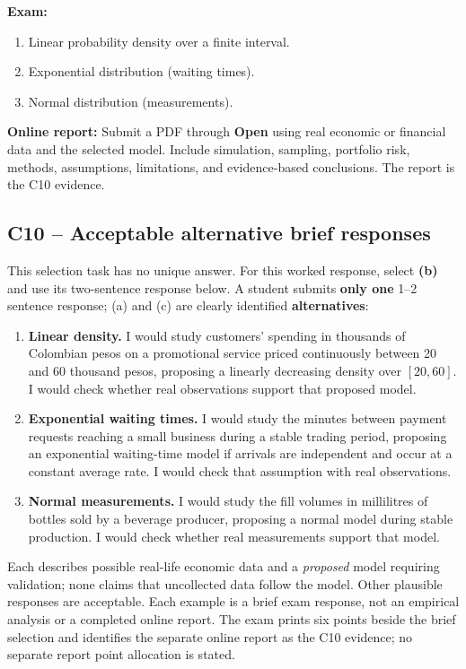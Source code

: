 {
\textbf{Exam:}
\begin{enumerate}[label=\textbf{(\alph*)},leftmargin=*]
\item Linear probability density over a finite interval.
\item Exponential distribution (waiting times).
\item Normal distribution (measurements).
\end{enumerate}

\textbf{Online report:} Submit a PDF through \textbf{Open} using real economic or financial data and the selected model. Include simulation, sampling, portfolio risk, methods, assumptions, limitations, and evidence-based conclusions. The report is the C10 evidence.

\label{sol:q17a}
\subsection*{C10 -- Acceptable alternative brief responses }

This selection task has no unique answer. For this worked response, select \textbf{(b)} and use its two-sentence response below.
A student submits \textbf{only one} 1--2 sentence response; (a) and (c) are clearly identified \textbf{alternatives}:
\begin{enumerate}[label=\textbf{(\alph*)},leftmargin=*]
\item \textbf{Linear density.} I would study customers' spending in thousands of Colombian pesos on a promotional service priced continuously between 20 and 60 thousand pesos, proposing a linearly decreasing density over $[20,60]$. I would check whether real observations support that proposed model.
\item \textbf{Exponential waiting times.} I would study the minutes between payment requests reaching a small business during a stable trading period, proposing an exponential waiting-time model if arrivals are independent and occur at a constant average rate. I would check that assumption with real observations.
\item \textbf{Normal measurements.} I would study the fill volumes in millilitres of bottles sold by a beverage producer, proposing a normal model during stable production. I would check whether real measurements support that model.
\end{enumerate}
Each describes possible real-life economic data and a \emph{proposed} model requiring validation;
none claims that uncollected data follow the model. Other plausible responses are acceptable.
Each example is a brief exam response, not an empirical analysis or a completed online report.
The exam prints six points beside the brief selection and identifies the separate online report as the C10 evidence; no separate report point allocation is stated.

}
